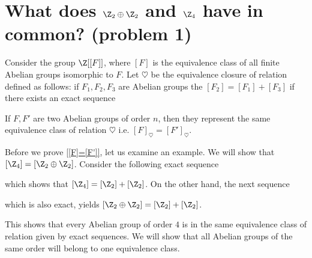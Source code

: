 
%

\section{What does $\Z_2\oplus\Z_2$ and $\Z_4$ have in common? (problem 1)}

Consider the group $\Z[[F]]$, where $[F]$ is the equivalence class of all finite Abelian groups isomorphic to $F$. Let $\heartsuit$ be the equivalence closure of relation defined as follows: if $F_1,F_2,F_3$ are Abelian groups the $[F_2]=[F_1]+[F_3]$ if there exists an exact sequence
\begin{center}\end{center}

\begin{lemma}\label{[F]=[F']}
  If $F, F'$ are two Abelian groups of order $n$, then they represent the same equivalence class of relation $ \heartsuit $ i.e. $[F]_\heartsuit = [F']_\heartsuit$.
\end{lemma}

\begin{example}\label{Z2+Z2=Z4}
  Before we prove \cref{[F]=[F']}, let us examine an example. We will show that $[\Z_4]=[\Z_2\oplus\Z_2]$. Consider the following exact sequence
  \begin{center}\end{center}
  which shows that $[\Z_4]=[\Z_2]+[\Z_2]$. On the other hand, the next sequence
  \begin{center}\end{center}
  which is also exact, yields $[\Z_2\oplus\Z_2]=[\Z_2]+[\Z_2]$.

  This shows that every Abelian group of order $4$ is in the same equivalence class of relation given by exact sequences. We will show that all Abelian groups of the same order will belong to one equivalence class.
\end{example}

